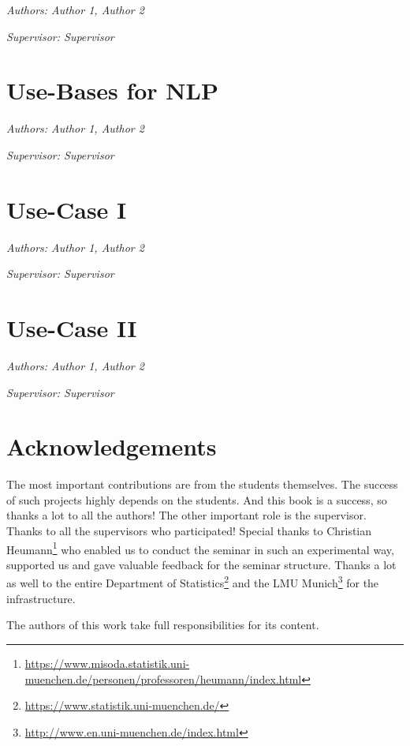 \documentclass[]{krantz}
\renewcommand{\href}[2]{#2\footnote{\url{#1}}}
\begin{document}
\emph{Authors: Author 1, Author 2}

\emph{Supervisor: Supervisor}

\hypertarget{use-bases-for-nlp}{%
\chapter{Use-Bases for NLP}\label{use-bases-for-nlp}}

\emph{Authors: Author 1, Author 2}

\emph{Supervisor: Supervisor}

\hypertarget{use-case-i}{%
\chapter{Use-Case I}\label{use-case-i}}

\emph{Authors: Author 1, Author 2}

\emph{Supervisor: Supervisor}

\hypertarget{use-case-ii}{%
\chapter{Use-Case II}\label{use-case-ii}}

\emph{Authors: Author 1, Author 2}

\emph{Supervisor: Supervisor}

\hypertarget{acknowledgements}{%
\chapter{Acknowledgements}\label{acknowledgements}}

The most important contributions are from the students themselves.
The success of such projects highly depends on the students.
And this book is a success, so thanks a lot to all the authors!
The other important role is the supervisor.
Thanks to all the supervisors who participated!
Special thanks to \href{https://www.misoda.statistik.uni-muenchen.de/personen/professoren/heumann/index.html}{Christian Heumann} who enabled us to conduct the seminar in such an experimental way, supported us and gave valuable feedback for the seminar structure.
Thanks a lot as well to the entire \href{https://www.statistik.uni-muenchen.de/}{Department of Statistics} and the \href{http://www.en.uni-muenchen.de/index.html}{LMU Munich} for the infrastructure.

The authors of this work take full responsibilities for its content.



\backmatter
\printindex
\end{document}
